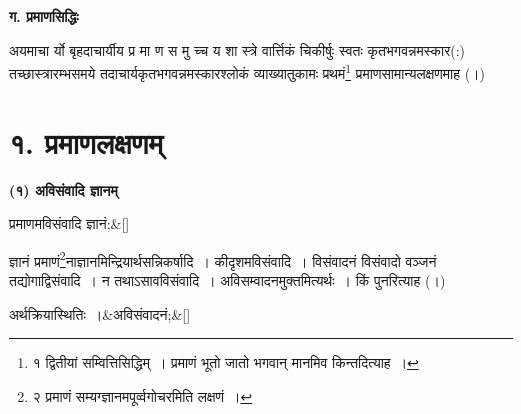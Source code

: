 \documentclass[article,12pt,a4paper]{memoir}
\begin{document}
	  \begin{center}%
	\textbf{ग. प्रमाणसिद्धिः}
	\end{center}
	

	  \pstart अयमाचा र्यो बृहदाचार्यीय प्र मा ण स मु च्च य शा स्त्रे वार्त्तिकं चिकीर्षुः स्वतः कृतभगवन्नमस्कार(:) तच्छास्त्रारम्भसमये तदाचार्यकृतभगवन्नमस्कारश्लोकं व्याख्यातुकामः प्रथमं\footnote{\label{pvv.3-1}  १ द्वितीयां सम्वित्तिसिद्धिम् । प्रमाणं भूतो जातो भगवान् मानमिव किन्तदित्याह ।} प्रमाणसामान्यलक्षणमाह (।)
	\pend
      
	  
	
\chapter[{१. प्रमाणलक्षणम्}]{१. प्रमाणलक्षणम्}

	  \begin{center}%
	\textbf{(१) अविसंवादि ज्ञानम्}
	\end{center}
	\label{div_pvv.1.3}
	  
	
	  \bigskip
	  \begingroup
	
	    \large
	  
	    
	    \stanza[\smallbreak]
	\label{pv.1.3a}प्रमाणमविसंवादि ज्ञानं;\&[\smallbreak]


	
	  \endgroup
	

	  \pstart ज्ञानं प्रमाणं\footnote{\label{pvv.3-2}  २ प्रमाणं सम्यग्ज्ञानमपूर्व्वगोचरमिति लक्षणं ।}नाज्ञानमिन्द्रियार्थसन्निकर्षादि । कीदृशमविसंवादि । विसंवादनं विसंवादो वञ्जनं तद्योगाद्विसंवादि । न तथाऽसावविसंवादि । अविसम्वादनमुक्तमित्यर्थः । किं पुनरित्याह (।)
	\pend
      
	  \bigskip
	  \begingroup
	
	    \large
	  
	    
	    \stanza[\smallbreak]
	\label{pv.1.3b}अर्थक्रियास्थितिः ।&अविसंवादनं;\&[\smallbreak]


	
	  \endgroup
	
\end{document}
